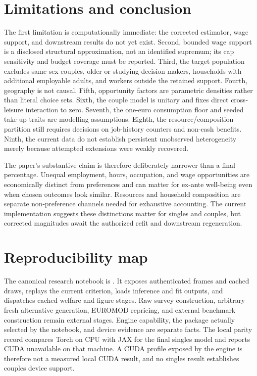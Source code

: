 \documentclass[11pt,a4paper]{article}
\begin{document}
\section{Limitations and conclusion}

The first limitation is computationally immediate: the corrected estimator,
wage support, and downstream results do not yet exist. Second, bounded wage
support is a disclosed structural approximation, not an identified supremum;
its cap sensitivity and budget coverage must be reported. Third, the target
population excludes same-sex couples, older or studying decision makers,
households with additional employable adults, and workers outside the retained
support. Fourth, geography is not causal. Fifth, opportunity factors are
parametric densities rather than literal choice sets. Sixth, the couple model is
unitary and fixes direct cross-leisure interaction to zero. Seventh, the
one-euro consumption floor and seeded take-up traits are modelling assumptions.
Eighth, the resource/composition partition still requires decisions on
job-history counters and non-cash benefits. Ninth, the current data do not
establish persistent unobserved heterogeneity merely because attempted
extensions were weakly recovered.

The paper's substantive claim is therefore deliberately narrower than a final
percentage. Unequal employment, hours, occupation, and wage opportunities are
economically distinct from preferences and can matter for ex-ante well-being
even when chosen outcomes look similar. Resources and household composition are
separate non-preference channels needed for exhaustive accounting. The current
implementation suggests these distinctions matter for singles and couples, but
corrected magnitudes await the authorized refit and downstream regeneration.

\appendix

\section{Reproducibility map}

The canonical research notebook is
. It
exposes authenticated frames and cached draws, replays the current criterion,
loads inference and fit outputs, and dispatches cached welfare and figure stages.
Raw survey construction, arbitrary fresh alternative generation, EUROMOD
repricing, and external benchmark construction remain external stages. Engine
capability, the package actually selected by the notebook, and device evidence
are separate facts. The local parity record compares Torch on CPU with JAX for
the final singles model and reports CUDA unavailable on that machine. A CUDA
profile exposed by the engine is therefore not a measured local CUDA result,
and no singles result establishes couples device support.
\end{document}
